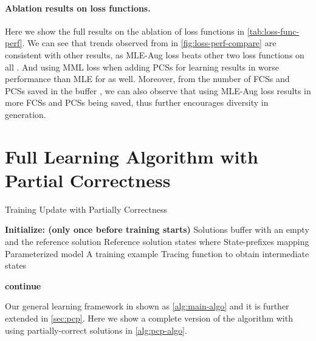 \paragraph{Ablation results on loss functions.}
Here we show the full results on the ablation of loss functions in \autoref{tab:loss-func-perf}. We can see that trends observed from  in \autoref{fig:loss-perf-compare} are consistent with other \patk results, as MLE-Aug loss beats other two loss functions on all \patk. And using MML loss when adding PCSs for learning results in worse performance than MLE for  as well. Moreover, from the number of FCSs and PCSs saved in the buffer , we can also observe that using MLE-Aug loss results in more FCSs and PCSs being saved, thus further encourages diversity in generation.

\section{Full Learning Algorithm with Partial Correctness} 
\label{sec:full-algo-pcp}
\begin{algorithm}[t]
    \small
    \caption{Training Update with Partially Correctness
    }
    \label{alg:pcp-algo}
\begin{algorithmic}
    \STATE \textbf{Initialize: (only once before training starts)} 
    \STATE \quad Solutions buffer  with an empty and the reference solution 
    \STATE \quad Reference solution states  where 
    \STATE \quad State-prefixes mapping 
    \STATE \quad Parameterized model  
    \STATE \quad A training example  
    \STATE \quad Tracing function  to obtain intermediate states
\end{algorithmic}
\begin{algorithmic}[1]
    \STATE  {}
            \FOR{; ; }
                \STATE  {}
                \IF{} 
                    \STATE   {}
                        \STATE 
                        \STATE 
                    \ENDIF
                    \STATE \textbf{continue} 
                \ENDIF
            \ENDFOR
        \ENDFOR
    \STATE 
\end{algorithmic}
\end{algorithm}
 Our general learning framework in shown as \autoref{alg:main-algo} and it is further extended in \autoref{sec:pcp}. Here we show a complete version of the algorithm with using partially-correct solutions in \autoref{alg:pcp-algo}.
